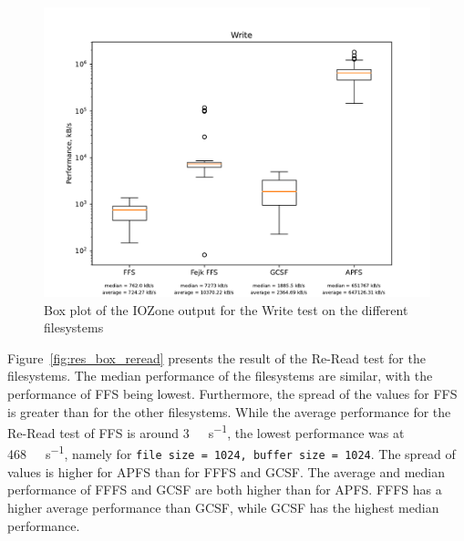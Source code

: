 \begin{figure}[!htb]
	\label{fig:res_box_write}
	\begin{center}
		\includegraphics[width=1.0\textwidth]{figures/benchmarking/Write_box.pdf}
	\end{center}
	\caption{Box plot of the IOZone output for the Write test on the different filesystems}
\end{figure}

Figure~\ref{fig:res_box_reread} presents the result of the \mbox{Re-Read} test for the filesystems. The median performance of the filesystems are similar, with the performance of \gls{FFS} being lowest. Furthermore, the spread of the values for \gls{FFS} is greater than for the other filesystems. While the average performance for the Re-Read test of \gls{FFS} is around \SI[per-mode = symbol]{3}{\giga\byte\per\second}, the lowest performance was at \SI[per-mode = symbol]{468}{\kilo\byte\per\second}, namely for \texttt{file size = 1024, buffer size = 1024}. The spread of values is higher for \gls{APFS} than for \gls{FFFS} and \gls{GCSF}. The average and median performance of \gls{FFFS} and \gls{GCSF} are both higher than for \gls{APFS}. \gls{FFFS} has a higher average performance than \gls{GCSF}, while \gls{GCSF} has the highest median performance.

